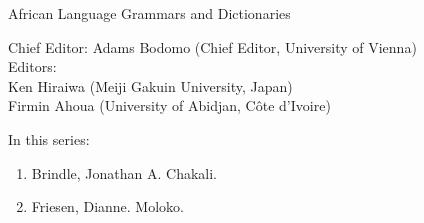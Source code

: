{\large African Language Grammars and Dictionaries}

\bigskip

Chief Editor:     Adams Bodomo (Chief Editor, University of Vienna)\\
\medskip 
Editors:\\
    Ken Hiraiwa (Meiji Gakuin University, Japan)\\
    Firmin Ahoua (University of Abidjan, Côte d'Ivoire)

\bigskip

In this series:

\begin{enumerate}
\item Brindle, Jonathan A. Chakali.
\item Friesen, Dianne. Moloko.
\end{enumerate}


\vfill

